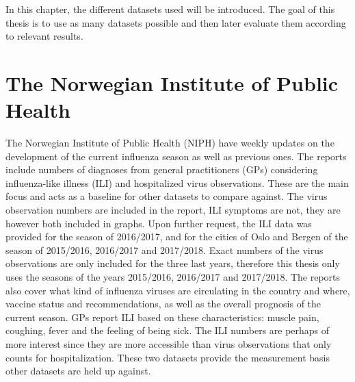 In this chapter, the different datasets used will be introduced. The goal of this thesis is to use as many datasets possible and then later evaluate them according to relevant results.

\section{The Norwegian Institute of Public Health}
The Norwegian Institute of Public Health (NIPH) have weekly updates\cite{fhi} on the development of the current influenza season as well as previous ones. The reports include numbers of diagnoses from general practitioners (GPs) considering influenza-like illness (ILI) and hospitalized virus observations. These are the main focus and acts as a baseline for other datasets to compare against. The virus observation numbers are included in the report, ILI symptoms are not, they are however both included in graphs. Upon further request, the ILI data was provided for the season of 2016/2017, and for the cities of Oslo and Bergen of the season of 2015/2016, 2016/2017 and 2017/2018. Exact numbers of the virus observations are only included for the three last years, therefore this thesis only uses the seasons of the years 2015/2016, 2016/2017 and 2017/2018. The reports also cover what kind of influenza viruses are circulating in the country and where, vaccine status and recommendations, as well as the overall prognosis of the current season. GPs report ILI based on these characteristics: muscle pain, coughing, fever and the feeling of being sick. The ILI numbers are perhaps of more interest since they are more accessible than virus observations that only counts for hospitalization. These two datasets provide the measurement basis other datasets are held up against.

